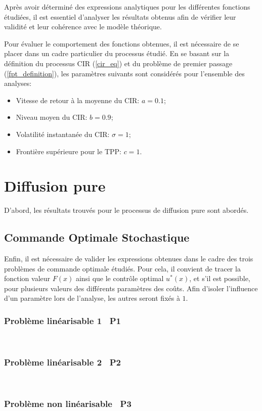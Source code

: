 \label{sec:Theme2}

Après avoir déterminé des expressions analytiques pour les différentes fonctions étudiées, il est essentiel d'analyser les résultats obtenus afin de vérifier leur validité et leur cohérence avec le modèle théorique. 

Pour évaluer le comportement des fonctions obtenues, il est nécessaire de se placer dans un cadre particulier du processus étudié. En se basant sur la définition du processus \acs{CIR} (\ref{cir_eq}) et du problème de premier passage (\ref{fpt_definition}), les paramètres suivants sont considérés pour l'ensemble des analyses:

\begin{itemize}
    \item Vitesse de retour à la moyenne du \acs{CIR}: $a=0.1$;
    \item Niveau moyen du \acs{CIR}: $b=0.9$;
    \item Volatilité instantanée du \acs{CIR}: $\sigma=1$;
    \item Frontière supérieure pour le \acs{TPP}: $c=1$.
\end{itemize}

\section{Diffusion pure}

D'abord, les résultats trouvés pour le processus de diffusion pure sont abordés.

\subsection{Commande Optimale Stochastique}

Enfin, il est nécessaire de valider les expressions obtenues dans le cadre des trois problèmes de commande optimale étudiés. Pour cela, il convient de tracer la fonction valeur $F(x)$ ainsi que le contrôle optimal $u^*(x)$, et s'il est possible, pour plusieurs valeurs des différents paramètres des coûts. Afin d'isoler l'influence d'un paramètre lors de l'analyse, les autres seront fixés à $1$.

\subsubsection{Problème linéarisable 1 \textemdash~P1}\phantom{}\\

\FloatBarrier\subsubsection{Problème linéarisable 2 \textemdash~P2}\phantom{}\\

\subsubsection{Problème non linéarisable \textemdash~P3}\phantom{}\\
